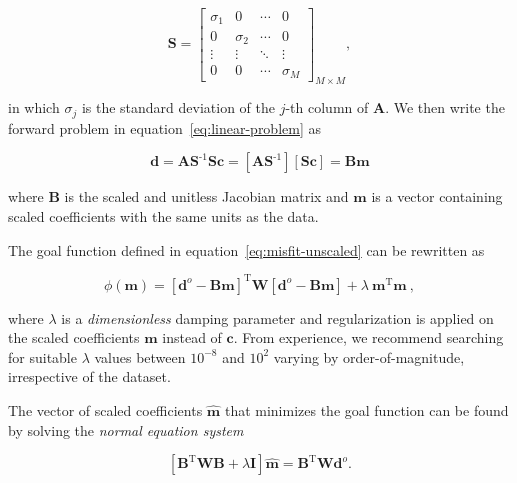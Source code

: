 \documentclass[twocolumn]{article}
\newcommand{\inv}{^{\text{-}1}}
\newcommand{\trans}{^{\text{T}}}
\begin{document}
\begin{equation}
    \mathbf{S} =
    \begin{bmatrix}
      \sigma_1 & 0 & \cdots &0 \\
      0 & \sigma_2 & \cdots &0 \\
      \vdots & \vdots & \ddots & \vdots \\
      0  & 0 & \cdots & \sigma_M
    \end{bmatrix}_{M \times M}
    ,
\end{equation}

\noindent in which $\sigma_j$ is the standard deviation of the $j$-th column of
$\mathbf{A}$.
We then write the forward problem in equation~\ref{eq:linear-problem} as

\begin{equation}
    \mathbf{d}
    =
    \mathbf{A} \mathbf{S}\inv \mathbf{S} \mathbf{c}
    =
    \left[
        \mathbf{A} \mathbf{S}\inv
    \right]
    \left[
        \mathbf{S} \mathbf{c}
    \right]
    =
    \mathbf{B} \mathbf{m}
\end{equation}

\noindent where $\mathbf{B}$ is the scaled and unitless Jacobian matrix and
$\mathbf{m}$ is a vector containing scaled coefficients with the same units as
the data.

The goal function defined in equation~\ref{eq:misfit-unscaled} can be
rewritten as

\begin{equation}
    \phi(\mathbf{m}) =
    \left[\mathbf{d}^o - \mathbf{B}\mathbf{m}\right]\trans
    \mathbf{W}
    \left[\mathbf{d}^o - \mathbf{B}\mathbf{m}\right]
    + \lambda\ \mathbf{m}\trans\mathbf{m}
    \ ,
    \label{eq:misfit}
\end{equation}

\noindent where $\lambda$ is a \emph{dimensionless} damping parameter and
regularization is applied on the scaled coefficients $\mathbf{m}$ instead of
$\mathbf{c}$.
From experience, we recommend searching for suitable $\lambda$ values between
$10^{-8}$ and $10^{2}$ varying by order-of-magnitude, irrespective of the
dataset.

The vector of scaled coefficients $\hat{\mathbf{m}}$ that minimizes the goal
function can be found by solving the \emph{normal equation system}
\citep{menke1989}

\begin{equation}
    \left[
      \mathbf{B}\trans \mathbf{W} \mathbf{B} + \lambda \mathbf{I}
    \right]
    \hat{\mathbf{m}} =
    \mathbf{B}\trans\mathbf{W}
    \mathbf{d}^o.
    \label{eq:least_squares_solution}
\end{equation}
\end{document}
